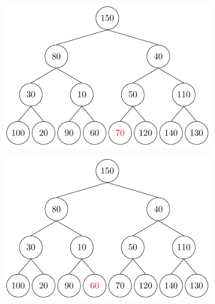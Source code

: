 \begin{center}
\begin{minipage}{0.24\textwidth}
\begin{figure}[H]
  \includegraphics[width=\textwidth]{Figure/Percolate3.pdf}
\end{figure}
\end{minipage}
\begin{minipage}{0.24\textwidth}
\begin{figure}[H]
  \centering
  \includegraphics[width=\textwidth]{Figure/Percolate4.pdf}
\end{figure}
\end{minipage}
\end{center}
